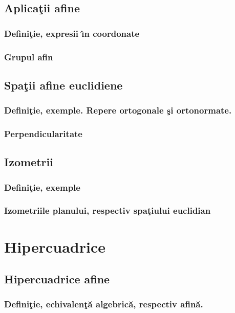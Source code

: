 \documentclass[12pt]{book}
\begin{document}

\section{Aplica\c tii afine}
\subsection{Defini\c tie, expresii \^{\i}n coordonate}
\subsection{Grupul afin}

\section{Spa\c tii afine euclidiene}

\subsection{Defini\c tie, exemple. Repere ortogonale \c si ortonormate.}
\subsection{Perpendicularitate}

\section{Izometrii}
\subsection{Defini\c tie, exemple}
\subsection{Izometriile planului, respectiv spa\c tiului euclidian}
\chapter{ Hipercuadrice}

\section{ Hipercuadrice afine}
\subsection{Defini\c tie, echivalen\c t\u a algebric\u a, respectiv afin\u a.}
\end{document}
